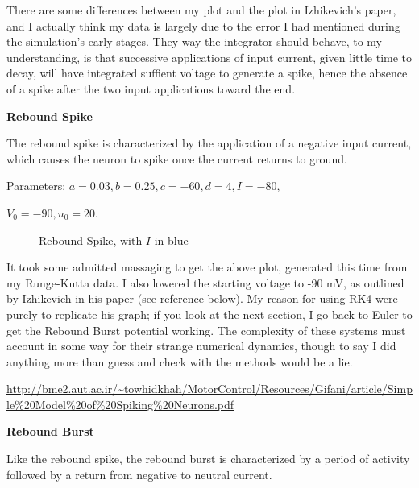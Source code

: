\documentclass[a4paper,12pt]{article}
\begin{document}
There are some differences between my plot and the plot in Izhikevich's paper, and I actually think my data is largely due to the error I had mentioned during the simulation's early stages. They way the integrator should behave, to my understanding, is that successive applications of input current, given little time to decay, will have integrated suffient voltage to generate a spike, hence the absence of a spike after the two input applications toward the end. 

\vfil\eject

{\bf Rebound Spike}
\bigskip

The rebound spike is characterized by the application of a negative input current, which causes the neuron to spike once the current returns to ground. 
 
\vspace{2mm} 

Parameters: $a=0.03, b=0.25, c=-60, d=4, I=-80, $

\vspace{1mm}

$V_{0}=-90, u_{0}=20$. 

\begin{figure}[h!]
\begin{center}
\end{center}
\caption{\label{pict13}Rebound Spike, with $I$ in blue}
\end{figure}

It took some admitted massaging to get the above plot, generated this time from my Runge-Kutta data. I also lowered the starting voltage to -90 mV, as outlined by Izhikevich in his paper (see reference below). My reason for using RK4 were purely to replicate his graph; if you look at the next section, I go back to Euler to get the Rebound Burst potential working. The complexity of these systems must account in some way for their strange numerical dynamics, though to say I did anything more than guess and check with the methods would be a lie. 

\url{http://bme2.aut.ac.ir/~towhidkhah/MotorControl/Resources/Gifani/article/Simple%20Model%20of%20Spiking%20Neurons.pdf}

\vfil\eject

{\bf Rebound Burst}
\bigskip

Like the rebound spike, the rebound burst is characterized by a period of activity followed by a return from negative to neutral current. 
 
\vspace{2mm} 
\end{document}
